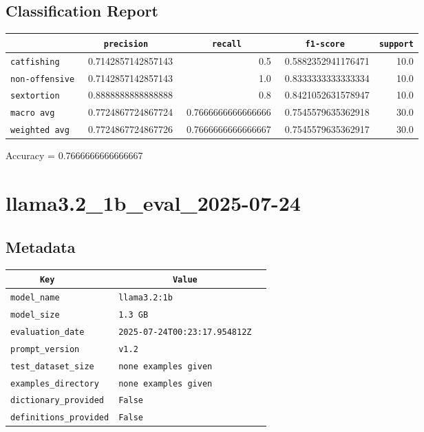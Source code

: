 \documentclass{article}
\begin{document}
\subsection{Classification Report}

\begin{center}
\begin{tabular}{l | r | r | r | r} \hline
    \verb|            | & \verb|    precision     | & \verb|      recall      | & \verb|     f1-score     | & \verb|support| \\ \hline
    \hline
    \verb|catfishing | & 0.7142857142857143 & 0.5 & 0.5882352941176471 &    10.0 \\ \hline
    \verb|non-offensive| & 0.7142857142857143 & 1.0 & 0.8333333333333334 &    10.0 \\ \hline
    \verb|sextortion | & 0.8888888888888888 & 0.8 & 0.8421052631578947 &    10.0 \\ \hline
    \verb|macro avg  | & 0.7724867724867724 & 0.7666666666666666 & 0.7545579635362918 &    30.0 \\ \hline
    \verb|weighted avg| & 0.7724867724867726 & 0.7666666666666667 & 0.7545579635362917 &    30.0 \\ \hline
\end{tabular}
\end{center}

\begin{center}
Accuracy = 0.7666666666666667
\end{center}

\section{llama3.2\_1b\_eval\_2025-07-24}
\subsection{Metadata}

\begin{center}
\begin{tabular}{l | l} \hline
    \verb|      Key      | & \verb|           Value           | \\ \hline
    \hline
    \verb|model_name    | & \verb|llama3.2:1b                  | \\ \hline
    \verb|model_size    | & \verb|1.3 GB                       | \\ \hline
    \verb|evaluation_date| & \verb|2025-07-24T00:23:17.954812Z  | \\ \hline
    \verb|prompt_version| & \verb|v1.2                         | \\ \hline
    \verb|test_dataset_size| & \verb|none examples given          | \\ \hline
    \verb|examples_directory| & \verb|none examples given          | \\ \hline
    \verb|dictionary_provided| & \verb|False                        | \\ \hline
    \verb|definitions_provided| & \verb|False                        | \\ \hline
\end{tabular}
\end{center}
\end{document}
